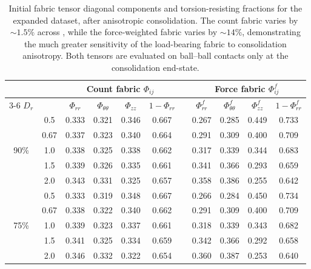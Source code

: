 \documentclass[../main]{subfiles}
\begin{document}
\begin{table}[t]
\centering
\caption{Initial fabric tensor diagonal components and torsion-resisting fractions for the expanded dataset, after anisotropic consolidation. The count fabric varies by ${\sim}1.5\%$ across \Kzero{}, while the force-weighted fabric varies by ${\sim}14\%$, demonstrating the much greater sensitivity of the load-bearing fabric to consolidation anisotropy. Both tensors are evaluated on ball--ball contacts only at the consolidation end-state.}
\label{tab:ch4_fabric_diagonal}
\small
\setlength{\tabcolsep}{4pt}
\begin{tabular}{ccccccccccc}
\toprule
& & \multicolumn{4}{c}{Count fabric $\Phi_{ij}$} & & \multicolumn{4}{c}{Force fabric $\Phi^f_{ij}$} \\
\cmidrule{3-6} \cmidrule{8-11}
$D_r$ & \Kzero{} & $\Phi_{rr}$ & $\Phi_{\theta\theta}$ & $\Phi_{zz}$ & $1{-}\Phi_{rr}$ & & $\Phi^f_{rr}$ & $\Phi^f_{\theta\theta}$ & $\Phi^f_{zz}$ & $1{-}\Phi^f_{rr}$ \\
\midrule
\multirow{5}{*}{90\%}
& 0.5  & 0.333 & 0.321 & 0.346 & 0.667 & & 0.267 & 0.285 & 0.449 & 0.733 \\
& 0.67 & 0.337 & 0.323 & 0.340 & 0.664 & & 0.291 & 0.309 & 0.400 & 0.709 \\
& 1.0  & 0.338 & 0.325 & 0.338 & 0.662 & & 0.317 & 0.339 & 0.344 & 0.683 \\
& 1.5  & 0.339 & 0.326 & 0.335 & 0.661 & & 0.341 & 0.366 & 0.293 & 0.659 \\
& 2.0  & 0.343 & 0.331 & 0.325 & 0.657 & & 0.358 & 0.386 & 0.255 & 0.642 \\
\midrule
\multirow{5}{*}{75\%}
& 0.5  & 0.333 & 0.319 & 0.348 & 0.667 & & 0.266 & 0.284 & 0.450 & 0.734 \\
& 0.67 & 0.338 & 0.322 & 0.340 & 0.662 & & 0.291 & 0.309 & 0.400 & 0.709 \\
& 1.0  & 0.339 & 0.323 & 0.337 & 0.661 & & 0.318 & 0.339 & 0.343 & 0.682 \\
& 1.5  & 0.341 & 0.325 & 0.334 & 0.659 & & 0.342 & 0.366 & 0.292 & 0.658 \\
& 2.0  & 0.346 & 0.332 & 0.322 & 0.654 & & 0.360 & 0.387 & 0.253 & 0.640 \\
\bottomrule
\end{tabular}
\end{table}
\end{document}
